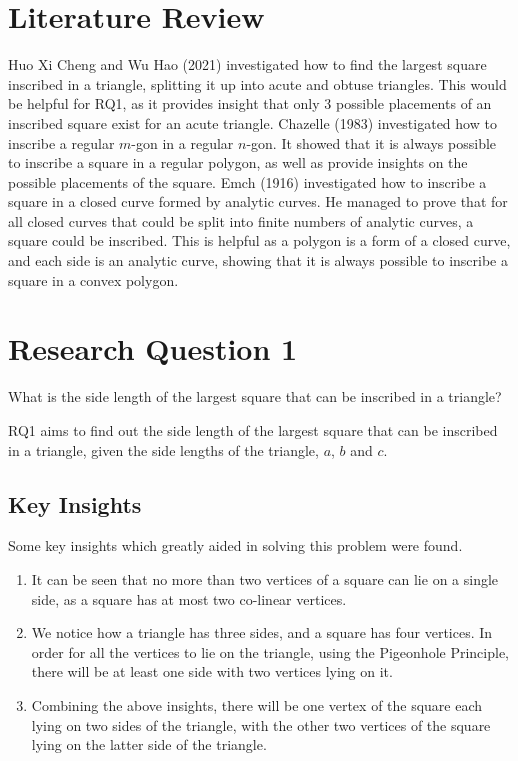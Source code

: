 \documentclass[12pt]{scrartcl}
\begin{document}
\section{Literature Review}
\cite{tbtb1} Huo Xi Cheng and Wu Hao (2021) investigated how to find the largest square inscribed in a triangle, splitting it up into acute and obtuse triangles. This would be helpful for RQ1, as it provides insight that only 3 possible placements of an inscribed square exist for an acute triangle.
\cite{chazelle} Chazelle (1983) investigated how to inscribe a regular $m$-gon in a regular $n$-gon. It showed that it is always possible to inscribe a square in a regular polygon, as well as provide insights on the possible placements of the square.
\cite{emch} Emch (1916) investigated how to inscribe a square in a closed curve formed by analytic curves. He managed to prove that for all closed curves that could be split into finite numbers of analytic curves, a square could be inscribed. This is helpful as a polygon is a form of a closed curve, and each side is an analytic curve, showing that it is always possible to inscribe a square in a convex polygon.

\pagebreak

\section{Research Question 1}
What is the side length of the largest square that can be inscribed in a triangle?

RQ1 aims to find out the side length of the largest square that can be inscribed in a triangle,
given the side lengths of the triangle, $a$, $b$ and $c$.

\subsection{Key Insights}
Some key insights which greatly aided in solving this problem were found.
\begin{enumerate}
	\item It can be seen that no more than two vertices of a square can lie on a single side,
	      as a square has at most two co-linear vertices.
	\item We notice how a triangle has three sides, and a square has four vertices.
	      In order for all the vertices to lie on the triangle, using the Pigeonhole Principle,
	      there will be at least one side with two vertices lying on it.
	\item Combining the above insights, there will be one vertex of the square
	      each lying on two sides of the triangle, with the other two vertices of the square
	      lying on the latter side of the triangle.
\end{enumerate}
\end{document}
